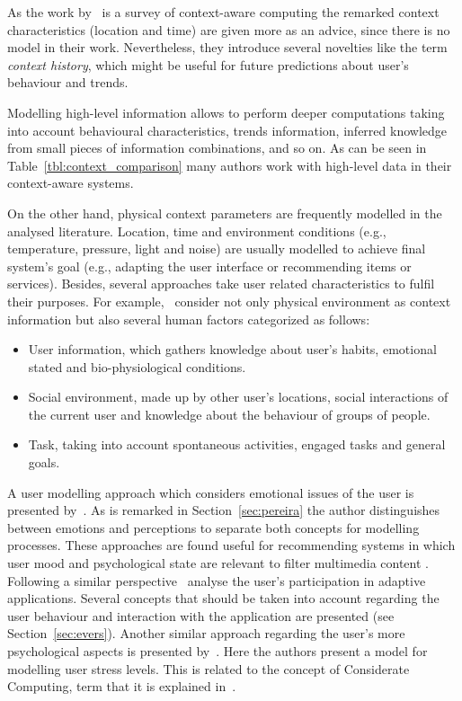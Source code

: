 As the work by~\citet{chen_survey_2000} is a survey of context-aware computing
the remarked context characteristics (location and time) are given more as an
advice, since there is no model in their work. Nevertheless, they introduce 
several novelties like the term \textit{context history}, which might be useful 
for future predictions about user's behaviour and trends.

Modelling high-level information allows to perform deeper computations taking
into account behavioural characteristics, trends information, inferred knowledge
from small pieces of information combinations, and so on. As can be seen in
Table~\ref{tbl:context_comparison} many authors work with high-level data in 
their context-aware systems. 

On the other hand, physical context parameters are frequently modelled in the
analysed literature. Location, time and environment conditions (e.g., temperature,
pressure, light and noise) are usually modelled to achieve final system's goal
(e.g., adapting the user interface or recommending items or services). Besides, 
several approaches take user related characteristics to fulfil their purposes. 
For example,~\citet{schmidt_there_1999} consider not only physical environment 
as context information but also several human factors categorized as follows:

\begin{itemize}
  \item User information, which gathers knowledge about user's habits, emotional
  stated and bio-physiological conditions.
  \item Social environment, made up by other user's locations, social interactions
  of the current user and knowledge about the behaviour of groups of people.
  \item Task, taking into account spontaneous activities, engaged tasks and 
  general goals.
\end{itemize}

A user modelling approach which considers emotional issues of the user is presented
by~\citet{pereira_triple_2005}. As is remarked in Section~\ref{sec:pereira}
the author distinguishes between emotions and perceptions to separate both concepts
for modelling processes. These approaches are found useful for recommending systems
in which user mood and psychological state are relevant to filter multimedia
content \citep{baltrunas_incarmusic_2011}. Following a similar perspective~\citet{evers_achieving_2012}
analyse the user's participation in adaptive applications. Several concepts that
should be taken into account regarding the user behaviour and interaction with
the application are presented (see Section~\ref{sec:evers}). Another similar
approach regarding the user's more psychological aspects is presented by~\citet{liao_decision_2005}.
Here the authors present a model for modelling user stress levels. This is related
to the concept of Considerate Computing, term that it is explained in~\citep{gibbs_considerate_2005}.

